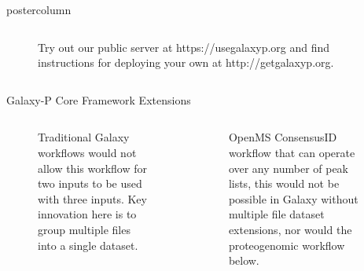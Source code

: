 \documentclass[final]{beamer}
\begin{document}
\begin{frame}
\begin{columns}
\begin{column}{.49\textwidth}
\begin{beamercolorbox}[center,wd=\textwidth]{postercolumn}
\begin{minipage}[T]{.99\textwidth}
{{\begin{columns}
\begin{column}{.49\textwidth}
\begin{figure}
                    \caption{Try out our public server at https://usegalaxyp.org and find instructions for deploying your own at http://getgalaxyp.org.}
                  \end{figure}
                \end{column}
              \end{columns}              
            }
            \vfill
              \begin{block}{Galaxy-P Core Framework Extensions}
                \begin{columns}
                  \begin{column}{.23\textwidth}
                    \begin{figure}
                      \caption{Traditional Galaxy workflows would not allow this workflow for two inputs to be used with three inputs. Key innovation here is to group multiple files into a single dataset.}
                    \end{figure}
                    \begin{figure}
                    \end{figure}  
                  \end{column}
                  \begin{column}{.37\textwidth}
                    \begin{figure}
                      \caption{OpenMS ConsensusID workflow that can operate over any number of peak lists, this would not be possible in Galaxy without multiple file dataset extensions, nor would the proteogenomic workflow below.}
                    \end{figure}
                  \end{column}
                \end{columns}
              \end{block}      

}
\end{minipage}
\end{beamercolorbox}
\end{column}
\end{columns}
\end{frame}
\end{document}
